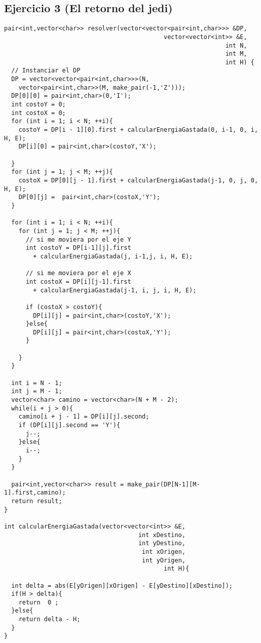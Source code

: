 \subsection{Ejercicio 3 (El retorno del jedi)}
\begin{lstlisting}
pair<int,vector<char>> resolver(vector<vector<pair<int,char>>> &DP, 
                                            vector<vector<int>> &E,
                                                             int N,
                                                             int M,
                                                             int H) {
  // Instanciar el DP
  DP = vector<vector<pair<int,char>>>(N,
    vector<pair<int,char>>(M, make_pair(-1,'Z')));
  DP[0][0] = pair<int,char>(0,'I');
  int costoY = 0;
  int costoX = 0;
  for (int i = 1; i < N; ++i){
    costoY = DP[i - 1][0].first + calcularEnergiaGastada(0, i-1, 0, i, H, E);
    DP[i][0] = pair<int,char>(costoY,'X');
    
  }
  for (int j = 1; j < M; ++j){
    costoX = DP[0][j - 1].first + calcularEnergiaGastada(j-1, 0, j, 0, H, E);
    DP[0][j] =  pair<int,char>(costoX,'Y');
  }

  for (int i = 1; i < N; ++i){
    for (int j = 1; j < M; ++j){
      // si me moviera por el eje Y
      int costoY = DP[i-1][j].first
        + calcularEnergiaGastada(j, i-1,j, i, H, E);
      
      // si me moviera por el eje X
      int costoX = DP[i][j-1].first
        + calcularEnergiaGastada(j-1, i, j, i, H, E);
      
      if (costoX > costoY){
        DP[i][j] = pair<int,char>(costoY,'X');
      }else{
        DP[i][j] = pair<int,char>(costoX,'Y');
      }

    }
  }

  int i = N - 1;
  int j = M - 1;
  vector<char> camino = vector<char>(N + M - 2);
  while(i + j > 0){
    camino[i + j - 1] = DP[i][j].second;
    if (DP[i][j].second == 'Y'){
      j--;
    }else{
      i--;
    }
  }
  
  pair<int,vector<char>> result = make_pair(DP[N-1][M-1].first,camino);
  return result;
}

int calcularEnergiaGastada(vector<vector<int>> &E,
                                     int xDestino,
                                     int yDestino,
                                      int xOrigen,
                                      int yOrigen,
                                            int H){
  
  int delta = abs(E[yOrigen][xOrigen] - E[yDestino][xDestino]);
  if(H > delta){
    return  0 ;
  }else{
    return delta - H;
  }
}
\end{lstlisting}

